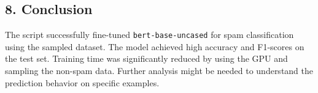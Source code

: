 \documentclass[a4paper,10pt]{article}
\begin{document}
\subsection{8. Conclusion}\label{conclusion}

The script successfully fine-tuned \texttt{bert-base-uncased} for spam
classification using the sampled dataset. The model achieved high
accuracy and F1-scores on the test set. Training time was significantly
reduced by using the GPU and sampling the non-spam data. Further
analysis might be needed to understand the prediction behavior on
specific examples.
\end{document}

